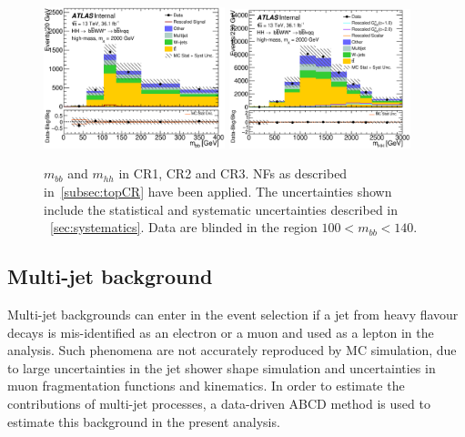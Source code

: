 \begin{figure}[!h]
\begin{center}
\includegraphics*[width=0.47\textwidth] {figures/ControlPlots_new/reOpt2000/C_reOpt2000_bbpt350_bbMass_regionA_met25d020}
\includegraphics*[width=0.47\textwidth] {figures/ControlPlots_new/reOpt2000/C_mBBcr_reOpt2000_bbpt350_hhMass_regionA_met25d020}

\caption[$m_{bb}$ and $m_{hh}$ in CR1, CR2 and CR3.]{$m_{bb}$ and $m_{hh}$ in CR1, CR2 and CR3.  \ttbar NFs as described in~\ref{subsec:topCR} have been applied. The uncertainties shown include the statistical and systematic uncertainties described in ~\ref{sec:systematics}. Data are blinded in the region $100 < m_{bb} < 140 $. }
\label{fig:mbb_mhh}
\end{center}
\end{figure}

\pagebreak
\subsection{Multi-jet background}

\label{sec:multijet}
Multi-jet backgrounds can enter in the event selection if a jet from
heavy flavour decays is mis-identified as an electron or a muon and used
as a lepton in the analysis. Such phenomena are not accurately reproduced by MC
simulation, due to large uncertainties in the jet shower shape simulation
and uncertainties in muon fragmentation functions and kinematics. In order 
to estimate the contributions of multi-jet processes, a data-driven ABCD 
method is used to estimate this background in the present analysis.


